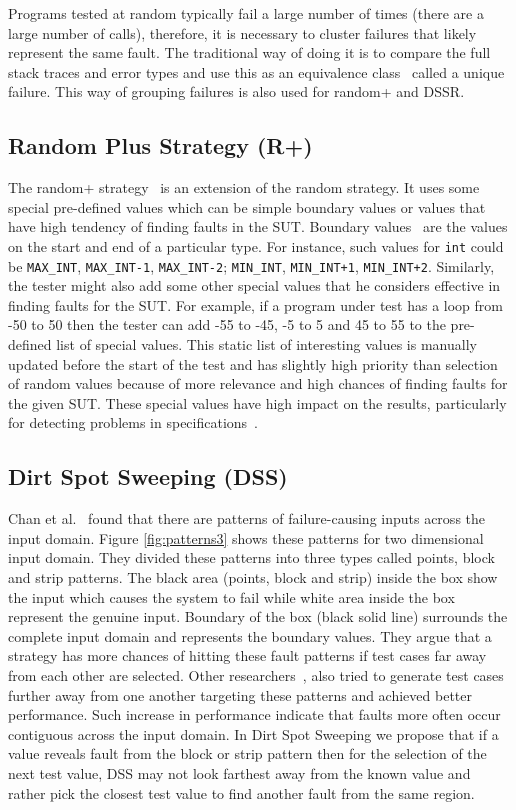 Programs tested at random typically fail a large number of times (there are a large number of calls), therefore, it is necessary to cluster failures that likely represent the same fault. The traditional way of doing it is to compare the full stack traces and error types and use this as an equivalence class~\cite{Ciupa2007,Oriol2012} called a unique failure. This way of grouping failures is also used for random+ and DSSR.

\subsection{Random Plus Strategy (R+)}
The random+ strategy~\cite{Leitner2007} is an extension of the random strategy. It uses some special pre-defined values which can be simple boundary values or values that have high tendency of finding faults in the SUT. Boundary values~\cite{Beizer1990} are the values on the start and end of a particular type. For instance, such values for \verb+int+ could be \verb+MAX_INT+, \verb+MAX_INT-1+, \verb+MAX_INT-2+; \verb+MIN_INT+, \verb-MIN_INT+1-, \verb-MIN_INT+2-. Similarly, the tester might also add some other special values that he considers effective in finding faults for the SUT. For example, if a program under test has a loop from -50 to 50 then the tester can add -55 to -45, -5 to 5 and 45 to 55 to the pre-defined list of special values. This static list of interesting values is manually updated before the start of the test and has slightly high priority than selection of random values because of more relevance and high chances of finding faults for the given SUT. These special values have high impact on the results, particularly for detecting problems in specifications~\cite{Ciupa2008}.


\subsection{Dirt Spot Sweeping (DSS)}
Chan et al.~\cite{Chan1996} found that there are patterns of failure-causing inputs across the input domain. Figure \ref{fig:patterns3} shows these patterns for two dimensional input domain. They divided these patterns into three types called points, block and strip patterns. The black area (points, block and strip) inside the box show the input which causes the system to fail while white area inside the box represent the genuine input. Boundary of the box (black solid line) surrounds the complete input domain and represents the boundary values. They argue that a strategy has more chances of hitting these fault patterns if test cases far away from each other are selected. Other researchers~\cite{Chan2002, Chen2003, Chen2005}, also tried to generate test cases further away from one another targeting these patterns and achieved better performance. Such increase in performance indicate that faults more often occur contiguous across the input domain. In Dirt Spot Sweeping we propose that if a value reveals fault from the block or strip pattern then for the selection of the next test value, DSS may not look farthest away from the known value and rather pick the closest test value to find another fault from the same region.

